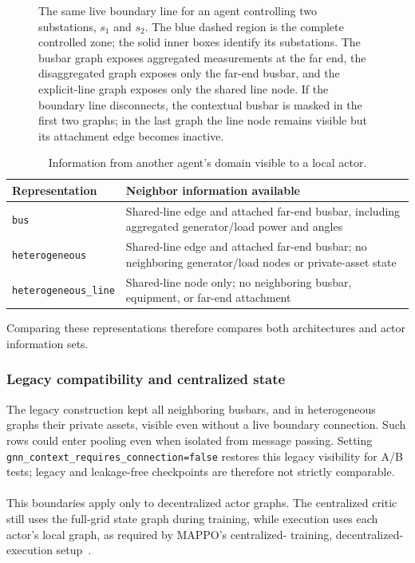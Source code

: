 \begin{figure}[H]
  \centering
  \resizebox{\linewidth}{!}{%
  }
  \caption{The same live boundary line for an agent controlling two
  substations, $s_1$ and $s_2$. The blue dashed region is the complete
  controlled zone; the solid inner boxes identify its substations. The busbar
  graph exposes aggregated measurements at the far end, the disaggregated
  graph exposes only the far-end busbar, and the explicit-line graph exposes
  only the shared line node. If the boundary line disconnects, the contextual
  busbar is masked in the first two graphs; in the last graph the line node
  remains visible but its attachment edge becomes inactive.}
  \label{fig:representation-dependent-neighbors}
\end{figure}

\begin{table}[H]
  \centering
  \small
  \caption{Information from another agent's domain visible to a local actor.}
  \label{tab:local-information-boundary}
  \setlength{\tabcolsep}{4pt}
  \begin{tabular}{L{0.24\textwidth}L{0.64\textwidth}}
    \toprule
    Representation & Neighbor information available \\
    \midrule
    \texttt{bus} & Shared-line edge and attached far-end busbar, including aggregated generator/load power and angles \\
    \texttt{heterogeneous} & Shared-line edge and attached far-end busbar; no neighboring generator/load nodes or private-asset state \\
    \texttt{heterogeneous\_line} & Shared-line node only; no neighboring busbar, equipment, or far-end attachment \\
    \bottomrule
  \end{tabular}
\end{table}

Comparing these representations therefore compares both architectures and
actor information sets.

\subsubsection{Legacy compatibility and centralized state}

{\color{red}
The legacy construction kept all neighboring busbars, and in heterogeneous
graphs their private assets, visible even without a live boundary connection.
Such rows could enter pooling even when isolated from message passing.
Setting \texttt{gnn\_context\_requires\_connection=false} restores this legacy
visibility for A/B tests; legacy and leakage-free checkpoints are therefore
not strictly comparable.}
\\
\\
This boundaries apply only to decentralized actor graphs. The centralized
critic still uses the full-grid state graph during training, while
execution uses each actor's local graph, as required by MAPPO's centralized-
training, decentralized-execution setup~\cite{yu2022mappo}.

